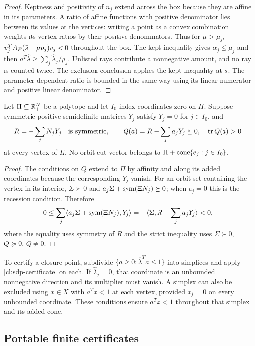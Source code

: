 \begin{proof}
Keptness and positivity of $n_j$ extend across the box because they
are affine in its parameters. A ratio of affine functions with positive
denominator lies between its values at the vertices: writing a point as
a convex combination weights its vertex ratios by their positive
denominators. Thus for $\mu>\mu_j$,
$v_j^TA_F(\bar s+\mu p_j)v_j<0$ throughout the box.
The kept inequality gives $\alpha_j\le\mu_j$ and then
$a^T\widehat\lambda\ge\sum_j\widehat\lambda_j/\mu_j$.
Unlisted rays contribute a nonnegative amount, and no ray is counted
twice. The exclusion conclusion applies the kept inequality at $\bar s$.
The parameter-dependent ratio is bounded in the same way using its
linear numerator and positive linear denominator.
\end{proof}

\begin{lemma}\label{cl:sdp-certificate}
Let $\Pi\subseteq\mathbb R_+^N$ be a polytope and let $I_0$ index coordinates
zero on $\Pi$. Suppose symmetric positive-semidefinite matrices $Y_j$
satisfy $Y_j=0$ for $j\in I_0$, and
\[
 R=-\sum_jN_jY_j\quad\text{is symmetric},\qquad
 Q(a)=R-\sum_ja_jY_j\succeq0,\quad\operatorname{tr} Q(a)>0
\]
at every vertex of $\Pi$. No orbit cut vector belongs to
$\Pi+\operatorname{cone}\{e_j:j\in I_0\}$.
\end{lemma}

\begin{proof}
The conditions on $Q$ extend to $\Pi$ by affinity and along its added
coordinates because the corresponding $Y_j$ vanish.
For an orbit set containing the vertex in its interior, $\Sigma\succ0$ and
$a_j\Sigma+\operatorname{sym}(\Xi N_j)\succeq0$; when $a_j=0$ this is the recession
condition. Therefore
\[
 0\le\sum_j\langle a_j\Sigma+\operatorname{sym}(\Xi N_j),Y_j\rangle
 =-\langle\Sigma,R-\sum_ja_jY_j\rangle<0,
\]
where the equality uses symmetry of $R$ and the strict inequality uses
$\Sigma\succ0$, $Q\succeq0$, $Q\ne0$.
\end{proof}

To certify a closure point, subdivide
$\{a\ge0:\widehat\lambda^Ta\le1\}$ into simplices and apply
\cref{cl:sdp-certificate} on each. If $\widehat\lambda_j=0$, that
coordinate is an unbounded nonnegative direction and its multiplier must
vanish. A simplex can also be excluded using $x\in X$ with $a^Tx<1$
at each vertex, provided $x_j=0$ on every unbounded coordinate. These
conditions ensure $a^Tx<1$ throughout that simplex and its added cone.

\subsection{Portable finite certificates}\label{cl:finite-certificates}

